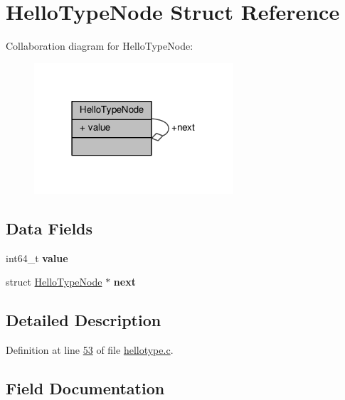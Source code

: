 \hypertarget{structHelloTypeNode}{}\section{Hello\+Type\+Node Struct Reference}
\label{structHelloTypeNode}


Collaboration diagram for Hello\+Type\+Node\+:\nopagebreak
\begin{figure}[H]
\begin{center}
\leavevmode
\includegraphics[width=210pt]{structHelloTypeNode__coll__graph}
\end{center}
\end{figure}
\subsection*{Data Fields}
\begin{DoxyCompactItemize}
\item 
\mbox{\label{structHelloTypeNode_a0f5dd9dcd6c2a57377d9faa6c3d0ce08}} 
int64\+\_\+t {\bfseries value}
\item 
\mbox{\label{structHelloTypeNode_af3637ca8d3c5f44d692660ec64d12a7d}} 
struct \hyperlink{structHelloTypeNode}{Hello\+Type\+Node} $\ast$ {\bfseries next}
\end{DoxyCompactItemize}


\subsection{Detailed Description}


Definition at line \hyperlink{hellotype_8c_source_l00053}{53} of file \hyperlink{hellotype_8c_source}{hellotype.\+c}.



\subsection{Field Documentation}
\mbox{\label{structHelloTypeNode_af3637ca8d3c5f44d692660ec64d12a7d}} 

